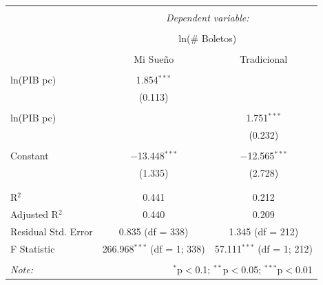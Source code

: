 \begin{table}[H]
\centering 
\begin{tabular}{@{\extracolsep{5pt}}lcc} 
\\[-1.8ex]\hline 
\hline \\[-1.8ex] 
 & \multicolumn{2}{c}{\textit{Dependent variable:}} \\ 
\cline{2-3} 
\\[-1.8ex] & \multicolumn{2}{c}{ln(\# Boletos)} \\ 
\\[-1.8ex] & Mi Sueño & Tradicional\\ 
\hline \\[-1.8ex] 
 ln(PIB pc) & 1.854$^{***}$ &  \\ 
  & (0.113) &  \\ 
  & & \\ 
 ln(PIB pc) &  & 1.751$^{***}$ \\ 
  &  & (0.232) \\ 
  & & \\ 
 Constant & $-$13.448$^{***}$ & $-$12.565$^{***}$ \\ 
  & (1.335) & (2.728) \\ 
  & & \\ 
\hline \\[-1.8ex] 
R$^{2}$ & 0.441 & 0.212 \\ 
Adjusted R$^{2}$ & 0.440 & 0.209 \\ 
Residual Std. Error & 0.835 (df = 338) & 1.345 (df = 212) \\ 
F Statistic & 266.968$^{***}$ (df = 1; 338) & 57.111$^{***}$ (df = 1; 212) \\ 
\hline 
\hline \\[-1.8ex] 
\textit{Note:}  & \multicolumn{2}{r}{$^{*}$p$<$0.1; $^{**}$p$<$0.05; $^{***}$p$<$0.01} \\ 
\end{tabular} 
\end{table}


